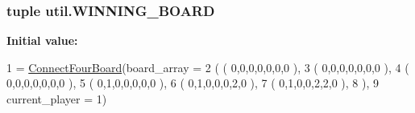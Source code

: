 \subsubsection[{W\+I\+N\+N\+I\+N\+G\+\_\+\+B\+O\+A\+R\+D}]{\setlength{\rightskip}{0pt plus 5cm}tuple util.\+W\+I\+N\+N\+I\+N\+G\+\_\+\+B\+O\+A\+R\+D}\label{namespaceutil_ad0bc1a0f6b9b7b0f55adf4b9120ba14d}
{\bfseries Initial value\+:}
\begin{DoxyCode}
1 = \hyperlink{classconnectfour_1_1_connect_four_board}{ConnectFourBoard}(board\_array =
2                                  ( ( 0,0,0,0,0,0,0 ),
3                                    ( 0,0,0,0,0,0,0 ),
4                                    ( 0,0,0,0,0,0,0 ),
5                                    ( 0,1,0,0,0,0,0 ),
6                                    ( 0,1,0,0,0,2,0 ),
7                                    ( 0,1,0,0,2,2,0 ),
8                                    ),
9                                  current\_player = 1)
\end{DoxyCode}
